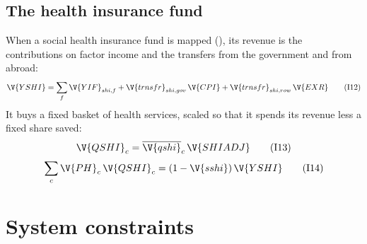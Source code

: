 \subsection{The health insurance fund}

When a social health insurance fund is mapped (), its
revenue is the contributions on factor income and the transfers from the
government and from abroad:
\begin{equation}
\V{YSHI} = \sum_f \V{YIF}_{shi,f} + \V{trnsfr}_{shi,gov}\,\V{CPI} + \V{trnsfr}_{shi,row}\,\V{EXR}
\tag{I12}\label{eq:I12}
\end{equation}
It buys a fixed basket of health services, scaled so that it spends its
revenue less a fixed share saved:
\begin{equation}
\V{QSHI}_c = \overline{\V{qshi}}_c\,\V{SHIADJ}
\tag{I13}\label{eq:I13}
\end{equation}
\begin{equation}
\sum_c \V{PH}_c\,\V{QSHI}_c = (1 - \V{sshi})\,\V{YSHI}
\tag{I14}\label{eq:I14}
\end{equation}

\section{System constraints}\label{sec:system}

